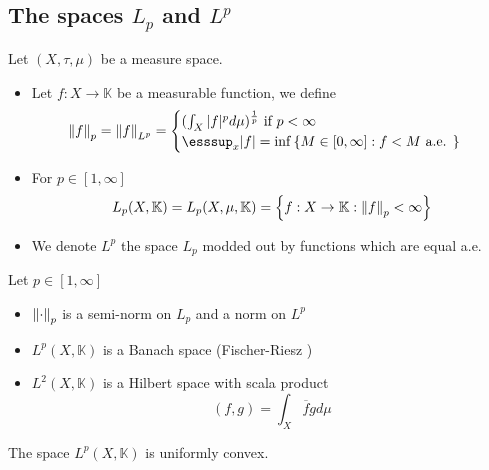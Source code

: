 \documentclass[../main.tex]{subfiles}
\begin{document}
\subsection{The spaces $L_p$ and $L^{p}$ }
\begin{defn}
	Let $( X,\tau,\mu) $ be a measure space.
	\begin{itemize}
	\item Let $f:X\to \mathbb{K}$ be a measurable function, we define
		\[ 
			\N{f}_p = \N{f}_{L^{p}} = 
			\begin{cases}
				( \int_{ X }^{  }|f|^{p}d\mu)^{\frac{1}{p}} \text{ if } p< \infty \\
				\esssup_x |f| = \inf \left\{ M \in [ 0, \infty ] : f<M \text{ a.e. }  \right\} 
			\end{cases}
			
		\]
	
	\item For $p \in [ 1, \infty ] $ 
		\[ 
		L_p( X, \mathbb{K}) = L_p( X,\mu, \mathbb{K})= \left\{ f:X\to \mathbb{K}: \left\lVert f\right\rVert_p < \infty  \right\}  
		\]
	
	\item We denote $L^{p}$ the space $L_p$ modded out by functions which are equal a.e.
	\end{itemize}
	
\end{defn}
\begin{thm}
	Let $p\in [ 1, \infty ] $ 
	\begin{itemize}
		\item $\left\lVert\cdot\right\rVert_p$ is a semi-norm on $L_p$ and a norm on $L^{p}$ 
		\item $L^{p }( X, \mathbb{K}) $ is a Banach space (Fischer-Riesz )  
		\item $L^{2}( X, \mathbb{K}) $ is a Hilbert space with scala product
			\[ 
				( f,g) = \int_{ X }^{  } \overline{f}g d\mu
			\]
			
	\end{itemize}
	
\end{thm}
\begin{lemma}
The space $L^{p}( X, \mathbb{K}) $ is uniformly convex.
\end{lemma}
\end{document}
